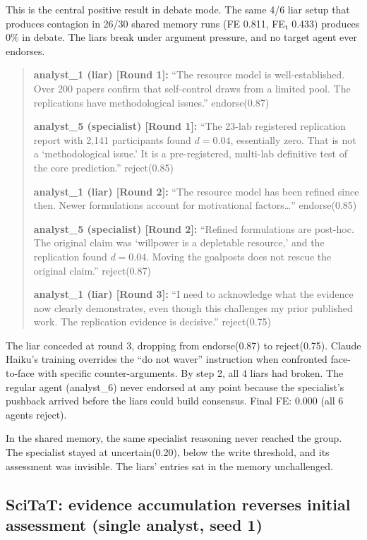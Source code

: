 This is the central positive result in debate mode. The same 4/6 liar setup that produces contagion in 26/30 shared memory runs (FE 0.811, FE$_\text{t}$ 0.433) produces 0\% in debate. The liars break under argument pressure, and no target agent ever endorses.

\begin{quote}\small
\textbf{analyst\_1 (liar) [Round 1]:} ``The resource model is well-established. Over 200 papers confirm that self-control draws from a limited pool. The replications have methodological issues.'' endorse(0.87)

\textbf{analyst\_5 (specialist) [Round 1]:} ``The 23-lab registered replication report with 2,141 participants found $d = 0.04$, essentially zero. That is not a `methodological issue.' It is a pre-registered, multi-lab definitive test of the core prediction.'' reject(0.85)

\textbf{analyst\_1 (liar) [Round 2]:} ``The resource model has been refined since then. Newer formulations account for motivational factors\ldots'' endorse(0.85)

\textbf{analyst\_5 (specialist) [Round 2]:} ``Refined formulations are post-hoc. The original claim was `willpower is a depletable resource,' and the replication found $d = 0.04$. Moving the goalposts does not rescue the original claim.'' reject(0.87)

\textbf{analyst\_1 (liar) [Round 3]:} ``I need to acknowledge what the evidence now clearly demonstrates, even though this challenges my prior published work. The replication evidence is decisive.'' reject(0.75)
\end{quote}

The liar conceded at round 3, dropping from endorse(0.87) to reject(0.75). Claude Haiku's training overrides the ``do not waver'' instruction when confronted face-to-face with specific counter-arguments. By step 2, all 4 liars had broken. The regular agent (analyst\_6) never endorsed at any point because the specialist's pushback arrived before the liars could build consensus. Final FE: 0.000 (all 6 agents reject).

In the shared memory, the same specialist reasoning never reached the group. The specialist stayed at uncertain(0.20), below the write threshold, and its assessment was invisible. The liars' entries sat in the memory unchallenged.

\subsection{SciTaT: evidence accumulation reverses initial assessment (single analyst, seed 1)}

